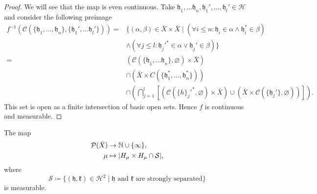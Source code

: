 \begin{proof}
  We will see that the map is even continuous. Take \(\mathfrak{h}_1,\dots \mathfrak{h}_n, \mathfrak{h}_1', \dots, \mathfrak{h}_l' \in \mathcal{H}\) and consider the following preimage
  \begin{align*}
    f^{-1}(\mathcal{C}(\{\mathfrak{h}_1, \dots, \mathfrak{h}_n\}, \{\mathfrak{h}_1', \dots \mathfrak{h}_l'\}))  = & \{(\alpha, \beta) \in \bar X \times \bar X \mid (\forall i \leq n\colon \mathfrak{h}_i \in \alpha \wedge \mathfrak{h}_i^\ast \in \beta)\\
    & \wedge (\forall j \leq l \colon \mathfrak{h}_j'^\ast \in \alpha \vee \mathfrak{h}_j' \in \beta)\}\\
    = & (\mathcal{C}(\{\mathfrak{h}_1, \dots \mathfrak{h}_n\}, \varnothing)  \times \bar X)\\
    & \cap (\bar X \times C(\{\mathfrak{h}_1^\ast, \dots, \mathfrak{h}_n^\ast\}))\\
                                                                                                                  & \cap \left ( \bigcap_{j=1}^l \left[(\mathcal{C}(\{h\}_j'^\ast, \varnothing) \times \bar X) \cup (\bar X \times \mathcal{C}(\{\mathfrak{h}_j'\}, \varnothing))\right]\right).
  \end{align*}
  This set is open as a finite intersection of basic open sets. Hence \(f\) is continuous and measurable.
\end{proof}

\begin{lemma}
  \label{lem:measurable-str-sep}
  The map
  \begin{align*}
    \mathcal{P}(\bar X) & \to \mathbb{N} \cup \{\infty\},\\
    \mu & \mapsto |H_\mu\times H_\mu \cap \mathcal{S}|,
  \end{align*}
  where
  \[
    \mathcal{S}\coloneqq \{(\mathfrak{h},\mathfrak{k}) \in \mathcal{H}^2 \mid \mathfrak{h} \text{ and } \mathfrak{k} \text{ are strongly separated}\}
  \]
  is measurable.
\end{lemma}


